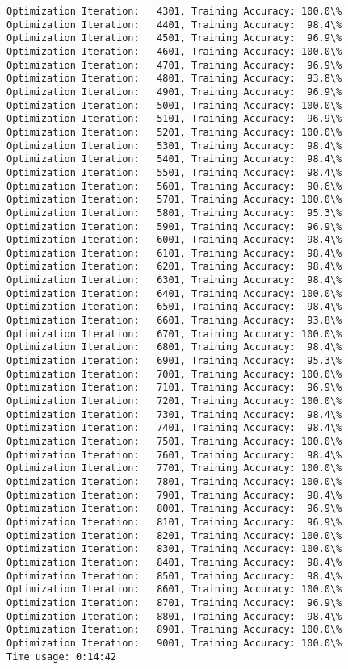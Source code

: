 \documentclass[11pt]{article}
\begin{document}
\begin{Verbatim}[commandchars=\\\{\}]
Optimization Iteration:   4301, Training Accuracy: 100.0\%
Optimization Iteration:   4401, Training Accuracy:  98.4\%
Optimization Iteration:   4501, Training Accuracy:  96.9\%
Optimization Iteration:   4601, Training Accuracy: 100.0\%
Optimization Iteration:   4701, Training Accuracy:  96.9\%
Optimization Iteration:   4801, Training Accuracy:  93.8\%
Optimization Iteration:   4901, Training Accuracy:  96.9\%
Optimization Iteration:   5001, Training Accuracy: 100.0\%
Optimization Iteration:   5101, Training Accuracy:  96.9\%
Optimization Iteration:   5201, Training Accuracy: 100.0\%
Optimization Iteration:   5301, Training Accuracy:  98.4\%
Optimization Iteration:   5401, Training Accuracy:  98.4\%
Optimization Iteration:   5501, Training Accuracy:  98.4\%
Optimization Iteration:   5601, Training Accuracy:  90.6\%
Optimization Iteration:   5701, Training Accuracy: 100.0\%
Optimization Iteration:   5801, Training Accuracy:  95.3\%
Optimization Iteration:   5901, Training Accuracy:  96.9\%
Optimization Iteration:   6001, Training Accuracy:  98.4\%
Optimization Iteration:   6101, Training Accuracy:  98.4\%
Optimization Iteration:   6201, Training Accuracy:  98.4\%
Optimization Iteration:   6301, Training Accuracy:  98.4\%
Optimization Iteration:   6401, Training Accuracy: 100.0\%
Optimization Iteration:   6501, Training Accuracy:  98.4\%
Optimization Iteration:   6601, Training Accuracy:  93.8\%
Optimization Iteration:   6701, Training Accuracy: 100.0\%
Optimization Iteration:   6801, Training Accuracy:  98.4\%
Optimization Iteration:   6901, Training Accuracy:  95.3\%
Optimization Iteration:   7001, Training Accuracy: 100.0\%
Optimization Iteration:   7101, Training Accuracy:  96.9\%
Optimization Iteration:   7201, Training Accuracy: 100.0\%
Optimization Iteration:   7301, Training Accuracy:  98.4\%
Optimization Iteration:   7401, Training Accuracy:  98.4\%
Optimization Iteration:   7501, Training Accuracy: 100.0\%
Optimization Iteration:   7601, Training Accuracy:  98.4\%
Optimization Iteration:   7701, Training Accuracy: 100.0\%
Optimization Iteration:   7801, Training Accuracy: 100.0\%
Optimization Iteration:   7901, Training Accuracy:  98.4\%
Optimization Iteration:   8001, Training Accuracy:  96.9\%
Optimization Iteration:   8101, Training Accuracy:  96.9\%
Optimization Iteration:   8201, Training Accuracy: 100.0\%
Optimization Iteration:   8301, Training Accuracy: 100.0\%
Optimization Iteration:   8401, Training Accuracy:  98.4\%
Optimization Iteration:   8501, Training Accuracy:  98.4\%
Optimization Iteration:   8601, Training Accuracy: 100.0\%
Optimization Iteration:   8701, Training Accuracy:  96.9\%
Optimization Iteration:   8801, Training Accuracy:  98.4\%
Optimization Iteration:   8901, Training Accuracy: 100.0\%
Optimization Iteration:   9001, Training Accuracy: 100.0\%
Time usage: 0:14:42

    \end{Verbatim}
\end{document}
